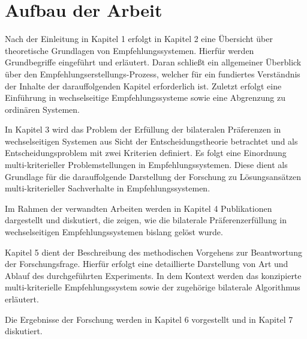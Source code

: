 \section{Aufbau der Arbeit}
\label{sec:einleitung:aufbau_der_arbeit}
Nach der Einleitung in Kapitel 1 erfolgt in Kapitel 2 eine Übersicht über theoretische Grundlagen von Empfehlungssystemen.
Hierfür werden Grundbegriffe eingeführt und erläutert.
Daran schließt ein allgemeiner Überblick über den Empfehlungserstellungs-Prozess, welcher für ein fundiertes Verständnis der Inhalte der darauffolgenden Kapitel erforderlich ist.
Zuletzt erfolgt eine Einführung in wechselseitige Empfehlungssysteme sowie eine Abgrenzung zu ordinären Systemen.

In Kapitel 3 wird das Problem der Erfüllung der bilateralen Präferenzen in wechselseitigen Systemen aus Sicht der Entscheidungstheorie betrachtet und als Entscheidungsproblem mit zwei Kriterien definiert.
Es folgt eine Einordnung multi-kriterieller Problemstellungen in Empfehlungssystemen.
Diese dient als Grundlage für die darauffolgende Darstellung der Forschung zu Lösungsansätzen multi-kriterieller Sachverhalte in Empfehlungssystemen.

Im Rahmen der verwandten Arbeiten werden in Kapitel 4 Publikationen dargestellt und diskutiert, die zeigen, wie die bilaterale Präferenzerfüllung in wechselseitigen Empfehlungssystemen bislang gelöst wurde.

Kapitel 5 dient der Beschreibung des methodischen Vorgehens zur Beantwortung der Forschungsfrage.
Hierfür erfolgt eine detaillierte Darstellung von Art und Ablauf des durchgeführten Experiments.
In dem Kontext werden das konzipierte multi-kriterielle Empfehlungssystem sowie der zugehörige bilaterale Algorithmus erläutert.

Die Ergebnisse der Forschung werden in Kapitel 6 vorgestellt und in Kapitel 7 diskutiert.

